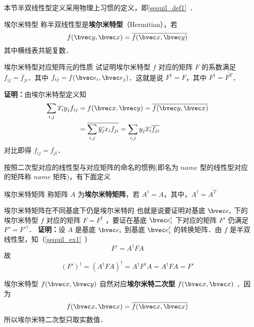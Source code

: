 本节半双线性型定义采用物理上习惯的定义，即\autoref{sequil_def1}~．
\begin{definition}{埃尔米特型}
称半双线性型是\textbf{埃尔米特型}（Hermitian），若
\begin{equation}\label{HeFor_eq2}
f(\bvec y,\bvec x)=\overline{f(\bvec x,\bvec y)}
\end{equation}
其中横线表共轭复数．
\end{definition}
\begin{example}{埃尔米特型对应矩阵元的性质}
试证明埃尔米特型 $f$ 对应的矩阵 $F$ 的系数满足 $f_{ij}=\overline f_{ji}$．其中 $f_{ij}=f(\bvec e_i,\bvec e_j)$．这就是说 $F^\dagger=F$，其中 $F^\dagger=\overline {F^T}$．

\textbf{证明：}由埃尔米特型定义知
\begin{equation}
\begin{aligned}
\sum_{i,j}\overline{x_i}y_j f_{ij}&=f(\bvec x,\bvec y)=\overline{f(\bvec y,\bvec x)}\\
&=\overline{\sum_{i,j}\overline{y_j} x_i f_{ji}}=\sum_{i,j}y_j\overline{x_i}\overline{f_{ji}}
\end{aligned}
\end{equation}
对比即得 $f_{ij}=\overline{f_{ji}}$．
\end{example}
按照二次型对应的线性型与对应矩阵的命名的惯例(即名为 $name$ 型的线性型对应的矩阵称 $name$ 矩阵)，有下面定义
\begin{definition}{埃尔米特矩阵}
称矩阵 $A$ 为\textbf{埃尔米特矩阵}，若 $A^\dagger=A$，其中，$A^\dagger=\overline{A^T}$
\end{definition}
\begin{example}{埃尔米特矩阵在不同基底下仍是埃尔米特的}
也就是说要证明对基底 $\bvec e_i$ 下的埃尔米特型 $f$ 对应的矩阵 $F=F^\dagger$ ，要证在基底 $\bvec e'_i$ 下对应的矩阵 $F'$ 仍满足 $F'=F'^\dagger$．
\textbf{证明：}设 $A$ 是基底 $\bvec e_i$ 到基底 $\bvec e'_i$ 的转换矩阵．由 $f$ 是半双线性型，知（\autoref{sequil_ex1}~）
\begin{equation}
F'=A^\dagger FA
\end{equation}
 故
\begin{equation}
(F')^\dagger=(A^\dagger FA)^\dagger=A^\dagger F^\dagger A=A^\dagger FA=F'
\end{equation}
\end{example}
埃尔米特型 $f(\bvec x,\bvec y)$ 自然对应\textbf{埃尔米特二次型} $f(\bvec x,\bvec x)$ ．因为
\begin{equation}
 f(\bvec x,\bvec x)= \overline{f(\bvec x,\bvec x)} 
\end{equation}
所以埃尔米特二次型只取实数值．

